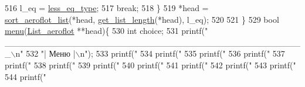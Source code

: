 \begin{DoxyCodeInclude}
{516             l\_eq = \hyperlink{main_8c_af923d128a7526a5e663112c9c69d98b5}{less\_eq\_type};
517             \textcolor{keywordflow}{break};
518     \}
519     *head = \hyperlink{main_8c_aeaba90c3e4069dc783a06dd0ad1314a9}{sort\_aeroflot\_list}(*head, \hyperlink{main_8c_aeb0a5da00ce0333f62523ac630e42196}{get\_list\_length}(*head), l\_eq);
520 
521 \}
529 \textcolor{keywordtype}{bool} \hyperlink{main_8c_afd62a5de84ed382e0c4b2ff7f788e6d9}{menu}(\hyperlink{structsingle__linked__list__aeroflot__struct}{List\_aeroflot} **head)\{
530     \textcolor{keywordtype}{int} choice;
531     printf(\textcolor{stringliteral}{" \_\_\_\_\_\_\_\_\_\_\_\_\_\_\_\_\_\_\_\_\_\_\_\_\_\_\_\_\_\_\_\_\_\_\_\_\_\_\_\_\_\_\_\_\_\_\_\_\_\(\backslash\)n"}
532            \textcolor{stringliteral}{"|                     Меню                        |\(\backslash\)n"});
533     printf(\textcolor{stringliteral}{"%
534     printf(\textcolor{stringliteral}{"%
535     printf(\textcolor{stringliteral}{"%
536     printf(\textcolor{stringliteral}{"%
537     printf(\textcolor{stringliteral}{"%
538     printf(\textcolor{stringliteral}{"%
539     printf(\textcolor{stringliteral}{"%
540     printf(\textcolor{stringliteral}{"%
541     printf(\textcolor{stringliteral}{"%
542     printf(\textcolor{stringliteral}{"%
543     printf(\textcolor{stringliteral}{"%
544     printf(\textcolor{stringliteral}{"%
}}}}}}}}}}}}}
\end{DoxyCodeInclude}

